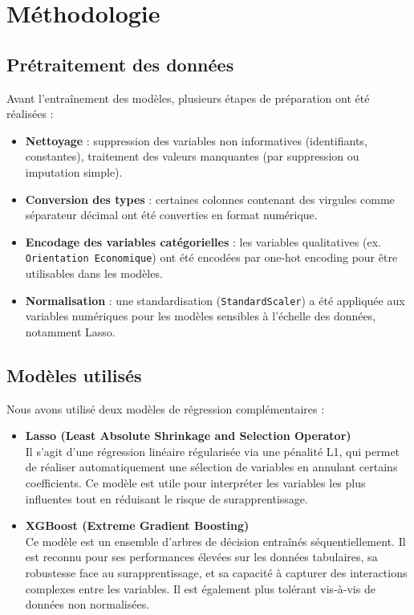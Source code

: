 \section{Méthodologie}
\subsection*{Prétraitement des données}

Avant l'entraînement des modèles, plusieurs étapes de préparation ont été réalisées :

\begin{itemize} 
  \item \textbf{Nettoyage} : suppression des variables non informatives (identifiants, constantes), traitement des valeurs manquantes (par suppression ou imputation simple).
  \item \textbf{Conversion des types} : certaines colonnes contenant des virgules comme séparateur décimal ont été converties en format numérique.
  \item \textbf{Encodage des variables catégorielles} : les variables qualitatives (ex. \texttt{Orientation Economique}) ont été encodées par one-hot encoding pour être utilisables dans les modèles.
  \item \textbf{Normalisation} : une standardisation (\texttt{StandardScaler}) a été appliquée aux variables numériques pour les modèles sensibles à l’échelle des données, notamment Lasso.
\end{itemize}

\subsection*{Modèles utilisés}

Nous avons utilisé deux modèles de régression complémentaires :

\begin{itemize}
  \item \textbf{Lasso (Least Absolute Shrinkage and Selection Operator)} \\
  Il s'agit d'une régression linéaire régularisée via une pénalité L1, qui permet de réaliser automatiquement une sélection de variables en annulant certains coefficients. Ce modèle est utile pour interpréter les variables les plus influentes tout en réduisant le risque de surapprentissage.

  \item \textbf{XGBoost (Extreme Gradient Boosting)} \\
  Ce modèle est un ensemble d’arbres de décision entraînés séquentiellement. Il est reconnu pour ses performances élevées sur les données tabulaires, sa robustesse face au surapprentissage, et sa capacité à capturer des interactions complexes entre les variables. Il est également plus tolérant vis-à-vis de données non normalisées.
\end{itemize}

